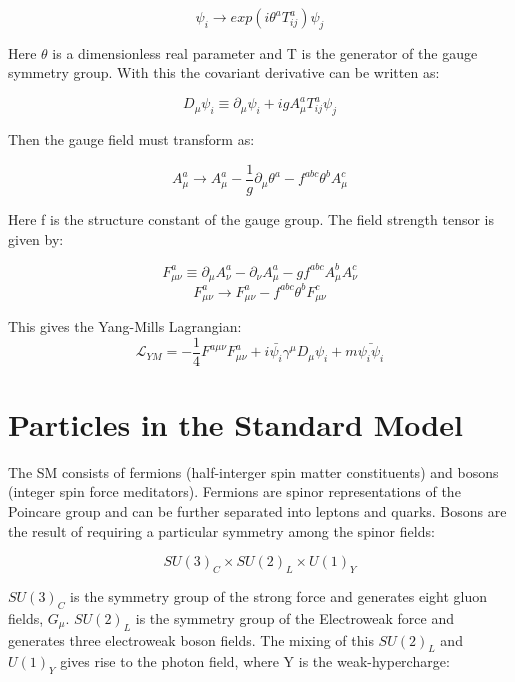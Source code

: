 \begin{equation}
\psi_{i} \rightarrow exp(i\theta^{a}T^{a}_{ij})\psi_{j}
\end{equation}

Here $\theta$ is a dimensionless real parameter and T is the generator of the gauge symmetry group. With this the covariant derivative can be written as:

\begin{equation}
D_{\mu}\psi_{i} \equiv \partial_{\mu}\psi_{i} + igA^{a}_{\mu}T^{a}_{ij}\psi_{j}
\end{equation}

Then the gauge field must transform as:

\begin{equation}
A^{a}_{\mu} \rightarrow A^{a}_{\mu} - \frac{1}{g}\partial_{\mu}\theta^{a} - f^{abc} \theta^{b} A_{\mu}^{c}
\end{equation}

Here f is the structure constant of the gauge group. The field strength tensor is given by:

\begin{equation}
F^{a}_{\mu\nu} \equiv \partial_{\mu}A^{a}_{\nu} - \partial_{\nu}A^{a}_{\mu} - gf^{abc}A^{b}_{\mu}A^{c}_{\nu}
\end{equation}
\begin{equation}
F^{a}_{\mu\nu} \rightarrow F^{a}_{\mu\nu} - f^{abc} \theta^{b}F^{c}_{\mu\nu}
\end{equation}

This gives the Yang-Mills Lagrangian:
\begin{equation}
\mathcal{L}_{YM}= -\frac{1}{4}F^{a\mu\nu}F^{a}_{\mu\nu}+i\bar{\psi_{i}}\gamma^{\mu}D_{\mu}\psi_{i}+m\bar{\psi_{i}\psi_{i}}
\end{equation}
\section{Particles in the Standard Model}
The SM consists of fermions (half-interger spin matter constituents) and bosons (integer spin force meditators). Fermions are spinor representations of the Poincare group and can be further separated into leptons and quarks. Bosons are the result of requiring a particular symmetry among the spinor fields:

\begin{equation}
SU(3)_{C} \times SU(2)_{L} \times U(1)_{Y}
\end{equation}

$SU(3)_{C}$ is the symmetry group of the strong force and generates eight gluon fields, $G_{\mu}$. $SU(2)_{L}$ is the symmetry group of the Electroweak force and generates three electroweak boson fields. The mixing of this $SU(2)_{L}$ and $U(1)_{Y}$ gives rise to the photon field, where Y is the weak-hypercharge:


